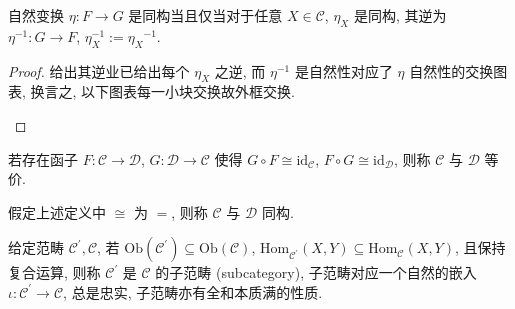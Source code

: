 \begin{lemma}
    \label {lemma:natural transformation is isomorphism iff each component is isomorphism}
    自然变换 \(\eta : F \to G\) 是同构当且仅当对于任意 \(X \in \mathcal{C}\), \(\eta_X\) 是同构,
    其逆为 \(\eta^{-1} : G \to F\), \(\eta^{-1}_X := {\eta_X}^{-1}\).

    \begin{proof}
        给出其逆业已给出每个 \(\eta_X\) 之逆, 而 \(\eta^{-1}\) 是自然性对应了
        \(\eta\) 自然性的交换图表, 换言之, 以下图表每一小块交换故外框交换.

        \begin{center}
        \end{center}
    \end{proof}
\end{lemma}

\begin{definition}[范畴等价]
    若存在函子 \(F : \mathcal{C} \to \mathcal{D}\), \(G : \mathcal{D} \to \mathcal{C}\) 使得 \(G \circ F \cong \mathrm{id}_{\mathcal{C}}\), \(F \circ G \cong \mathrm{id}_{\mathcal{D}}\), 则称 \(\mathcal{C}\) 与 \(\mathcal{D}\) 等价.

    假定上述定义中 \(\cong\) 为 \(=\), 则称 \(\mathcal{C}\) 与 \(\mathcal{D}\) 同构.
\end{definition}

\begin{definition}[子范畴]
    给定范畴 \(\mathcal{C}^\prime, \mathcal{C}\), 若 \(\mathrm{Ob} (\mathcal{C}^\prime) \subseteq \mathrm{Ob} (\mathcal{C})\), 
    \(\mathrm{Hom}_{\mathcal{C}^\prime} (X,Y) \subseteq \mathrm{Hom}_{\mathcal{C}} (X,Y)\), 且保持复合运算,
    则称 \(\mathcal{C}^\prime\) 是 \(\mathcal{C}\) 的子范畴 (subcategory), 子范畴对应一个自然的嵌入 \(\iota : \mathcal{C}^\prime \to \mathcal{C}\),
    总是忠实, 子范畴亦有全和本质满的性质.
\end{definition}

